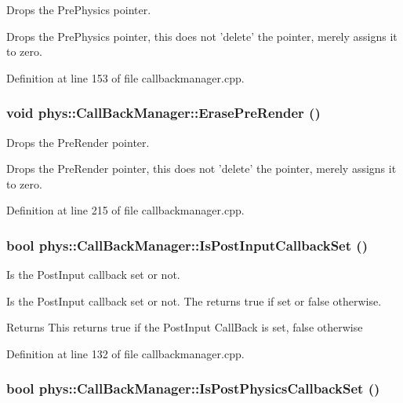 Drops the PrePhysics pointer. 

Drops the PrePhysics pointer, this does not 'delete' the pointer, merely assigns it to zero. 

Definition at line 153 of file callbackmanager.cpp.

\hypertarget{classphys_1_1CallBackManager_adadf16f3f38398c9593646416ef18499}{
\subsubsection[{ErasePreRender}]{\setlength{\rightskip}{0pt plus 5cm}void phys::CallBackManager::ErasePreRender ()}}
\label{d1/d47/classphys_1_1CallBackManager_adadf16f3f38398c9593646416ef18499}


Drops the PreRender pointer. 

Drops the PreRender pointer, this does not 'delete' the pointer, merely assigns it to zero. 

Definition at line 215 of file callbackmanager.cpp.

\hypertarget{classphys_1_1CallBackManager_a075b799a815a2be2a83e30bb689711a7}{
\subsubsection[{IsPostInputCallbackSet}]{\setlength{\rightskip}{0pt plus 5cm}bool phys::CallBackManager::IsPostInputCallbackSet ()}}
\label{d1/d47/classphys_1_1CallBackManager_a075b799a815a2be2a83e30bb689711a7}


Is the PostInput callback set or not. 

Is the PostInput callback set or not. The returns true if set or false otherwise. \begin{DoxyReturn}{Returns}
This returns true if the PostInput CallBack is set, false otherwise 
\end{DoxyReturn}


Definition at line 132 of file callbackmanager.cpp.

\hypertarget{classphys_1_1CallBackManager_ac4bf07f907b8d4d7e052126bcfbba4ba}{
\subsubsection[{IsPostPhysicsCallbackSet}]{\setlength{\rightskip}{0pt plus 5cm}bool phys::CallBackManager::IsPostPhysicsCallbackSet ()}}
\label{d1/d47/classphys_1_1CallBackManager_ac4bf07f907b8d4d7e052126bcfbba4ba}



